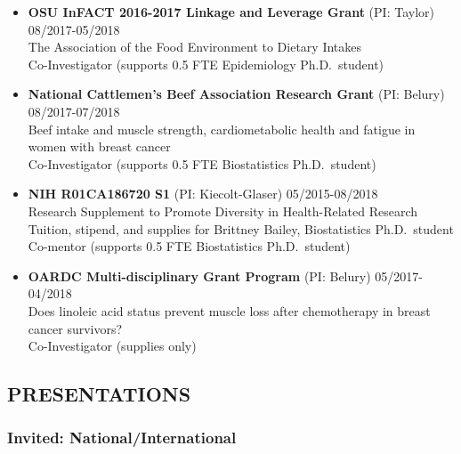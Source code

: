 \documentclass[
  english,
  letterpaper,
  DIV=11,
  numbers=noendperiod]{scrartcl}
\providecommand{\tightlist}{%
  \setlength{\itemsep}{0pt}\setlength{\parskip}{0pt}}
\begin{document}
\begin{itemize}
\tightlist
\item
  \textbf{OSU InFACT 2016-2017 Linkage and Leverage Grant} (PI: Taylor)
  {08/2017-05/2018}\\
  The Association of the Food Environment to Dietary Intakes\\
  Co-Investigator (supports 0.5 FTE Epidemiology Ph.D.~student)
\item
  \textbf{National Cattlemen's Beef Association Research Grant} (PI:
  Belury) {08/2017-07/2018}\\
  Beef intake and muscle strength, cardiometabolic health and fatigue in
  women with breast cancer\\
  Co-Investigator (supports 0.5 FTE Biostatistics Ph.D.~student)
\item
  \textbf{NIH R01CA186720 S1} (PI: Kiecolt-Glaser) {05/2015-08/2018}\\
  Research Supplement to Promote Diversity in Health-Related Research\\
  Tuition, stipend, and supplies for Brittney Bailey, Biostatistics
  Ph.D.~student\\
  Co-mentor (supports 0.5 FTE Biostatistics Ph.D.~student)
\item
  \textbf{OARDC Multi-disciplinary Grant Program} (PI: Belury)
  {05/2017-04/2018}\\
  Does linoleic acid status prevent muscle loss after chemotherapy in
  breast cancer survivors?\\
  Co-Investigator (supplies only)
\end{itemize}

\subsection{PRESENTATIONS}\label{presentations}

\subsubsection{Invited:
National/International}\label{invited-nationalinternational}
\end{document}

